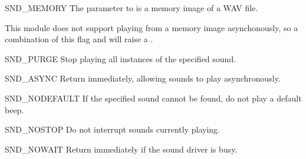 \begin{datadesc}{SND_MEMORY}
  The  parameter to  is a memory
  image of a WAV file.

    This module does not support playing from a memory
  image asynchonously, so a combination of this flag and
   will raise a .
\end{datadesc}

\begin{datadesc}{SND_PURGE}
  Stop playing all instances of the specified sound.
\end{datadesc}

\begin{datadesc}{SND_ASYNC}
  Return immediately, allowing sounds to play asynchronously.
\end{datadesc}

\begin{datadesc}{SND_NODEFAULT}
  If the specified sound cannot be found, do not play a default beep.
\end{datadesc}

\begin{datadesc}{SND_NOSTOP}
  Do not interrupt sounds currently playing.
\end{datadesc}

\begin{datadesc}{SND_NOWAIT}
  Return immediately if the sound driver is busy.
\end{datadesc}
